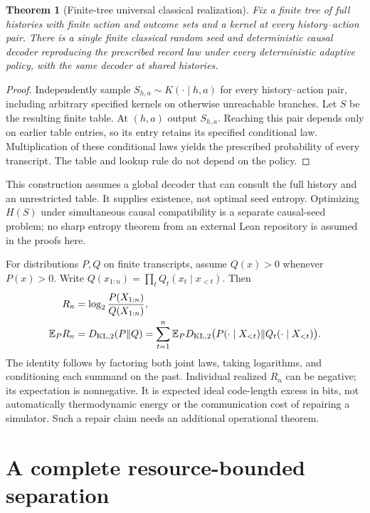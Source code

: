 \documentclass[11pt,a4paper]{article}
\newtheorem{theorem}{Theorem}[section]
\theoremstyle{definition}
\newcommand{\E}{\mathbb E}
\begin{document}
\begin{theorem}[Finite-tree universal classical realization]\label{thm:seed}
Fix a finite tree of full histories with finite action and outcome sets and a kernel at every history--action pair. There is a single finite classical random seed and deterministic causal decoder reproducing the prescribed record law under every deterministic adaptive policy, with the same decoder at shared histories.
\end{theorem}
\begin{proof}
Independently sample $S_{h,a}\sim K(\cdot\mid h,a)$ for every history--action pair, including arbitrary specified kernels on otherwise unreachable branches. Let $S$ be the resulting finite table. At $(h,a)$ output $S_{h,a}$. Reaching this pair depends only on earlier table entries, so its entry retains its specified conditional law. Multiplication of these conditional laws yields the prescribed probability of every transcript. The table and lookup rule do not depend on the policy.
\end{proof}
This construction assumes a global decoder that can consult the full history and an unrestricted table. It supplies existence, not optimal seed entropy. Optimizing $H(S)$ under simultaneous causal compatibility is a separate causal-seed problem; no sharp entropy theorem from an external Lean repository is assumed in the proofs here.

For distributions $P,Q$ on finite transcripts, assume $Q(x)>0$ whenever $P(x)>0$. Write $Q(x_{1:n})=\prod_tQ_t(x_t\mid x_{<t})$. Then
\begin{align}
 R_n&=\log_2{P(X_{1:n})\over Q(X_{1:n})},\\
 \E_PR_n&=D_{\rm KL,2}(P\|Q)
 =\sum_{t=1}^n\E_P D_{\rm KL,2}
 \bigl(P(\cdot\mid X_{<t})\|Q_t(\cdot\mid X_{<t})\bigr).
\end{align}
The identity follows by factoring both joint laws, taking logarithms, and conditioning each summand on the past. Individual realized $R_n$ can be negative; its expectation is nonnegative. It is expected ideal code-length excess in bits, not automatically thermodynamic energy or the communication cost of repairing a simulator. Such a repair claim needs an additional operational theorem.

\section{A complete resource-bounded separation}
\end{document}
